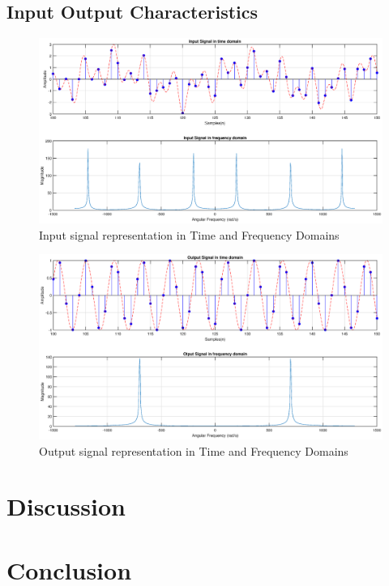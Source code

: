 \documentclass[a4paper,11pt]{article}%
\begin{document}
\pagebreak
\subsection{Input Output Characteristics}
\begin{figure}[!h]
	\centering
	\includegraphics[scale=0.4]{figures/input-signal}
	\caption{Input signal representation in Time and Frequency Domains}
\end{figure}

\begin{figure}[!h]
	\centering
	\includegraphics[scale=0.4]{figures/output-signal}
	\caption{Output signal representation in Time and Frequency Domains}
\end{figure}
\pagebreak
\section{Discussion}
\section{Conclusion}
%


\pagebreak


%
\end{document}

